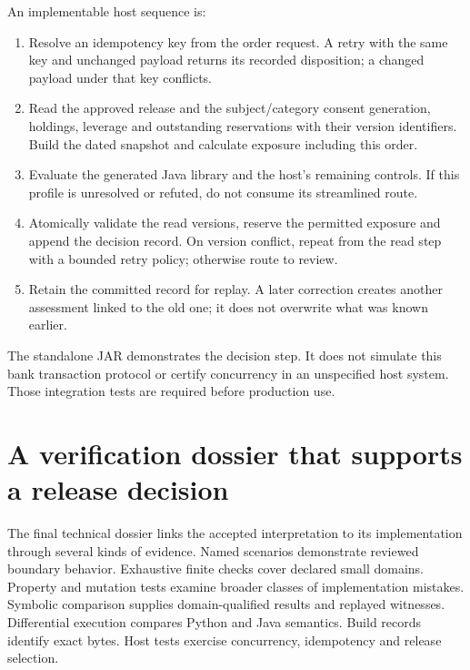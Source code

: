 
An implementable host sequence is:
\begin{enumerate}
\item Resolve an idempotency key from the order request. A retry with the same
key and unchanged payload returns its recorded disposition; a changed payload
under that key conflicts.
\item Read the approved release and the subject/category consent generation,
holdings, leverage and outstanding reservations with their version identifiers.
Build the dated snapshot and calculate exposure including this order.
\item Evaluate the generated Java library and the host's remaining controls.
If this profile is unresolved or refuted, do not consume its streamlined route.
\item Atomically validate the read versions, reserve the permitted exposure and
append the decision record. On version conflict, repeat from the read step with
a bounded retry policy; otherwise route to review.
\item Retain the committed record for replay. A later correction creates another
assessment linked to the old one; it does not overwrite what was known earlier.
\end{enumerate}
The standalone JAR demonstrates the decision step. It does not simulate this
bank transaction protocol or certify concurrency in an unspecified host system.
Those integration tests are required before production use.

\section{A verification dossier that supports a release decision}
\label{merge:M07:14}


The final technical dossier links the accepted interpretation to its implementation
through several kinds of evidence. Named scenarios demonstrate reviewed boundary
behavior. Exhaustive finite checks cover declared small domains. Property and
mutation tests examine broader classes of implementation mistakes. Symbolic
comparison supplies domain-qualified results and replayed witnesses. Differential
execution compares Python and Java semantics. Build records identify exact bytes.
Host tests exercise concurrency, idempotency and release selection.

